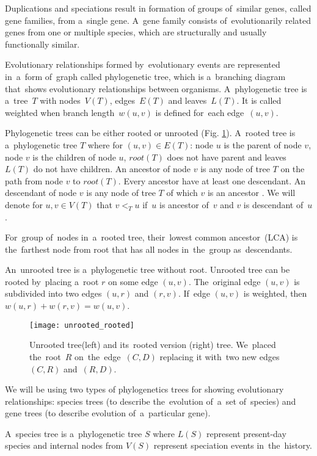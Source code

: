 Duplications and speciations result in formation of groups of~similar genes, called gene families, from a~single gene. A~gene family consists of~evolutionarily related genes from one or multiple species, which are structurally and usually functionally similar.

Evolutionary relationships formed by~evolutionary events are represented in~a~form of~graph called phylogenetic tree, which is a~branching diagram that~shows evolutionary relationships between organisms. A~phylogenetic tree is a~tree~$T$ with nodes~$V(T)$, edges~$E(T)$ and leaves~$L(T)$. It is called weighted when branch length~$w(u, v)$ is defined for~each edge~$(u, v)$.

Phylogenetic trees can be either rooted or unrooted (Fig. \ref{unrooted_rooted}). A~rooted tree is a~phylogenetic tree $T$ where for $(u, v) \in E(T)$: node $u$ is the parent of node $v$, node $v$ is the children of node $u$, $root(T)$ does not have parent and leaves $L(T)$ do not have children. An ancestor of node $v$ is any node of tree $T$ on the path from node $v$ to $root(T)$. Every ancestor have at least one descendant. An descendant of node $v$ is any node of tree $T$ of which $v$ is an ancestor \cite{hasic}. We will denote for $u, v \in V(T)$ that $v<_Tu$ if~$u$ is ancestor of~$v$ and $v$ is descendant of~$u$.

For~group of~nodes in~a~rooted tree, their~lowest common ancestor~(LCA) is the~farthest node from root that has all nodes in~the~group as~descendants.

An~unrooted tree is a~phylogenetic tree without root. Unrooted tree can be rooted by~placing a~root $r$ on some edge $(u, v)$. The~original edge $(u, v)$ is subdivided into two edges $(u, r)$ and $(r, v)$. If~edge $(u, v)$ is weighted, then $w(u, r) + w(r, v) = w(u, v)$.

\begin{figure}[h]
	\centering
	\label{unrooted_rooted}
  	\texttt{[image: unrooted\_rooted]}
  	\caption{Unrooted tree(left) and its~rooted version (right) tree. We~placed the~root~$R$ on~the~edge~$(C, D)$ replacing it with~two new edges~$(C, R)$ and~$(R, D)$.}
\end{figure}

We will be using two types of phylogenetics trees for showing evolutionary relationships: species trees (to describe the~evolution of~a~set of~species) and gene trees (to describe evolution of~a~particular gene).

A~species tree is a~phylogenetic tree $S$ where $L(S)$ represent present-day species and internal nodes from $V(S)$ represent speciation events in~the~history.

